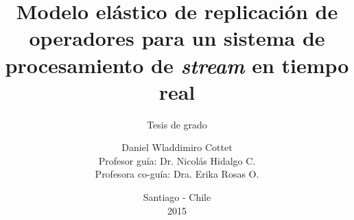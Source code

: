 \title[Tesis de grado]{Modelo elástico de replicación de operadores para un sistema de procesamiento de \textit{stream} en tiempo real}

\subtitle{Tesis de grado}

\author[Daniel Wladdimiro C.]{Daniel Wladdimiro Cottet\\\scriptsize{Profesor guía: Dr. Nicol\'as Hidalgo C.}\\\scriptsize{Profesora co-guía: Dra. Erika Rosas O.}}



\date[Santiago, 2015]{\scriptsize{Santiago - Chile\\2015}}

\begin{frame}
  \titlepage
\end{frame}